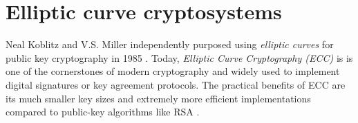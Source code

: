 \section{Elliptic curve cryptosystems}

Neal Koblitz and V.S. Miller independently purposed using \emph{elliptic curves} for public key cryptography in 1985 \cite{bruce, bruce867, bruce1095}. Today, \emph{Elliptic Curve Cryptography (ECC)} is is one of the cornerstones of modern cryptography and widely used to implement digital signatures or key agreement protocols. The practical benefits of ECC are its much smaller key sizes and extremely more efficient implementations compared to public-key algorithms like RSA \cite{rsa, eddsa, rsavsecc}.
